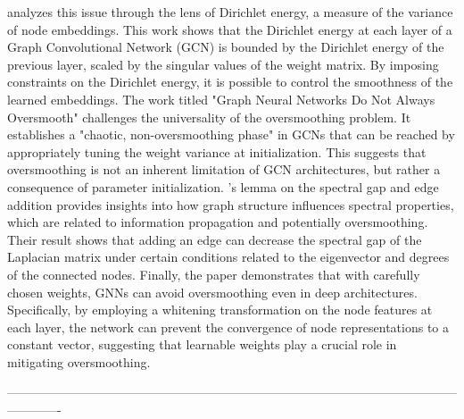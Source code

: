 \documentclass[11pt]{article}\usepackage{amsmath,amssymb,amsthm,bbm}
\newcommand{\1}{\mathbbm{1}}
\begin{document}
\cite{zhou2021dirichlet} analyzes this issue through the lens of Dirichlet energy, a measure of the variance of node embeddings. This work shows that the Dirichlet energy at each layer of a Graph Convolutional Network (GCN) is bounded by the Dirichlet energy of the previous layer, scaled by the singular values of the weight matrix. By imposing constraints on the Dirichlet energy, it is possible to control the smoothness of the learned embeddings. The work titled "Graph Neural Networks Do Not Always Oversmooth" challenges the universality of the oversmoothing problem. It establishes a "chaotic, non-oversmoothing phase" in GCNs that can be reached by appropriately tuning the weight variance at initialization. This suggests that oversmoothing is not an inherent limitation of GCN architectures, but rather a consequence of parameter initialization. \cite{eldan2017braess}'s lemma on the spectral gap and edge addition provides insights into how graph structure influences spectral properties, which are related to information propagation and potentially oversmoothing. Their result shows that adding an edge can decrease the spectral gap of the Laplacian matrix under certain conditions related to the eigenvector and degrees of the connected nodes. Finally, the paper \cite{zhuo2024graph} demonstrates that with carefully chosen weights, GNNs can avoid oversmoothing even in deep architectures. Specifically, by employing a whitening transformation on the node features at each layer, the network can prevent the convergence of node representations to a constant vector, suggesting that learnable weights play a crucial role in mitigating oversmoothing.

-------------------------------------------------------------------------------------------------------------------------
\end{document}

